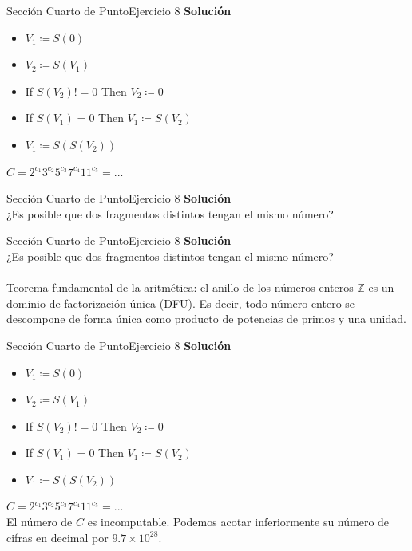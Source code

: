 \documentclass[10pt, envcountsect, presentation, aspectratio=169]{beamer}
\begin{document}

\begin{frame}{Sección Cuarto de Punto}{Ejercicio 8}
    \textbf{Solución}\\
    \begin{itemize}
        \item[] $V_1 \coloneqq S(0)$
        \item[] $V_2 \coloneqq S(V_1)$
        \item[] If $S(V_2)!=0$ Then $V_2 \coloneqq0$
        \item[] If $S(V_1)=0$ Then $V_1 \coloneqq S(V_2)$
        \item[] $V_1 \coloneqq S(S(V_2))$
    \end{itemize}
    $C = 2^{c_1} 3^{c_2} 5^{c_3} 7^{c_4} 11^{c_5} = ...$
\end{frame}


\begin{frame}{Sección Cuarto de Punto}{Ejercicio 8}
    \textbf{Solución}\\
    ¿Es posible que dos fragmentos distintos tengan el mismo número?
\end{frame}


\begin{frame}{Sección Cuarto de Punto}{Ejercicio 8}
    \textbf{Solución}\\
    ¿Es posible que dos fragmentos distintos tengan el mismo número?\\~\\
    Teorema fundamental de la aritmética: el anillo de los números enteros $\mathbb{Z}$ es un dominio de factorización única (DFU).
    Es decir, todo número entero se descompone de forma única como producto de potencias de primos y una unidad. 
\end{frame}


\begin{frame}{Sección Cuarto de Punto}{Ejercicio 8}
    \textbf{Solución}\\
    \begin{itemize}
        \item[] $V_1 \coloneqq S(0)$
        \item[] $V_2 \coloneqq S(V_1)$
        \item[] If $S(V_2)!=0$ Then $V_2 \coloneqq0$
        \item[] If $S(V_1)=0$ Then $V_1 \coloneqq S(V_2)$
        \item[] $V_1 \coloneqq S(S(V_2))$
    \end{itemize}
    $C = 2^{c_1} 3^{c_2} 5^{c_3} 7^{c_4} 11^{c_5} = ...$\\
    El número de $C$ es incomputable. Podemos acotar inferiormente su número de cifras en decimal por $9.7 \times 10^{28}$.
\end{frame}
\end{document}

